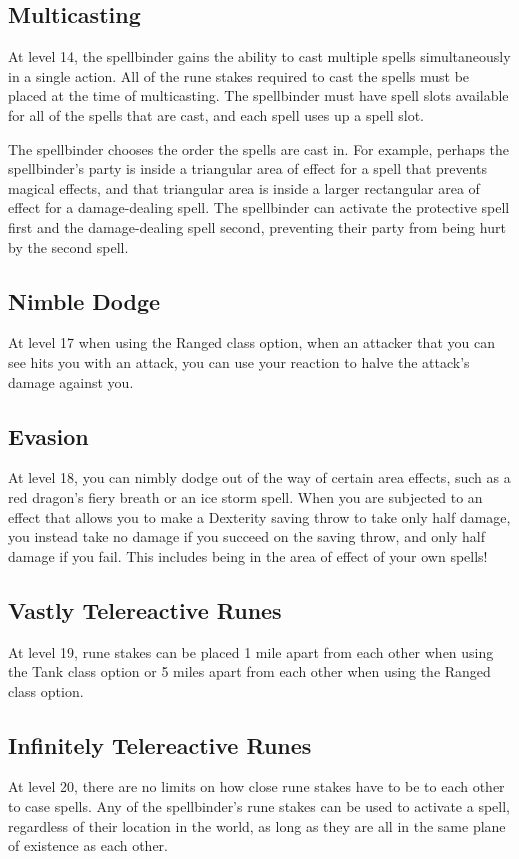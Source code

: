 \subsection{Multicasting}
At level 14, the spellbinder gains the ability to cast multiple spells simultaneously in a single action. All of the rune stakes required to cast the spells must be placed at the time of multicasting. The spellbinder must have spell slots available for all of the spells that are cast, and each spell uses up a spell slot.

The spellbinder chooses the order the spells are cast in. For example, perhaps the spellbinder's party is inside a triangular area of effect for a spell that prevents magical effects, and that triangular area is inside a larger rectangular area of effect for a damage-dealing spell. The spellbinder can activate the protective spell first and the damage-dealing spell second, preventing their party from being hurt by the second spell.

\subsection{Nimble Dodge}
At level 17 when using the Ranged class option, when an attacker that you can see hits you with an attack, you can use your reaction to halve the attack's damage against you.

\subsection{Evasion}
At level 18, you can nimbly dodge out of the way of certain area effects, such as a red dragon's fiery breath or an ice storm spell. When you are subjected
to an effect that allows you to make a Dexterity saving throw to take only half damage, you instead take no damage if you succeed on the saving throw, and only half damage if you fail. This includes being in the area of effect of your own spells!

\subsection{Vastly Telereactive Runes}
At level 19, rune stakes can be placed 1 mile apart from each other when using the Tank class option or 5 miles apart from each other when using the Ranged class option.

\subsection{Infinitely Telereactive Runes}
At level 20, there are no limits on how close rune stakes have to be to each other to case spells. Any of the spellbinder's rune stakes can be used to activate a spell, regardless of their location in the world, as long as they are all in the same plane of existence as each other.

